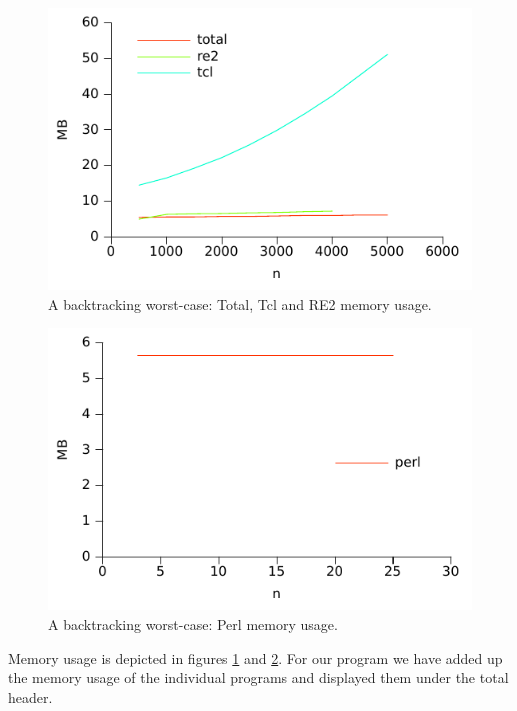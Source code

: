 \begin{figure}
\centering
\includegraphics{benchmarks/memory/backtrackingworstcase_mem_totalre2tcl.pdf}
\caption{A backtracking worst-case: Total, Tcl and RE2 memory usage.}
\label{fig:backtrackingworstcase_mem_maintclre2_normal}
\end{figure}

\begin{figure}
\centering
\includegraphics{benchmarks/memory/backtrackingworstcase_mem_perl.pdf}
\caption{A backtracking worst-case: Perl memory usage.}
\label{fig:backtrackingworstcase_mem_perl_log}
\end{figure}

Memory usage is depicted in figures
\ref{fig:backtrackingworstcase_mem_maintclre2_normal} and
\ref{fig:backtrackingworstcase_mem_perl_log}. For our program we have
added up the memory usage of the individual programs and displayed
them under the total header. 

